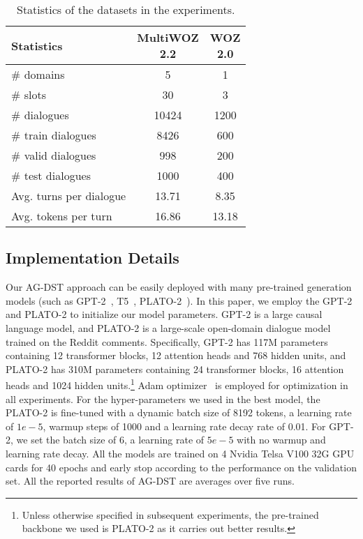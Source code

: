 \documentclass[11pt]{article}
\begin{document}
\begin{table}
\centering
\begin{tabular}{lcc}
\hline
\textbf{Statistics} & \makecell[c]{\textbf{MultiWOZ} \\ \textbf{2.2}} & \makecell[c]{\textbf{WOZ} \\ \textbf{2.0}} \\
\hline
\hline
\# domains & 5 & 1 \\
\# slots & 30 & 3 \\
\# dialogues & 10424 & 1200 \\
\# train dialogues & 8426 & 600 \\
\# valid dialogues & 998 & 200 \\
\# test dialogues & 1000 & 400 \\
Avg. turns per dialogue & 13.71 & 8.35 \\
Avg. tokens per turn & 16.86 & 13.18 \\
\hline
\end{tabular}
\caption{Statistics of the datasets in the experiments.}\label{tab:datasets}
\end{table}

\subsection{Implementation Details}\label{sec:implementation_details}

Our AG-DST approach can be easily deployed with many pre-trained generation models (such as GPT-2~\citep{radford2019language}, T5~\citep{JMLR:v21:20-074}, PLATO-2~\citep{bao-etal-2021-plato}). In this paper, we employ the GPT-2 and PLATO-2 to initialize our model parameters. GPT-2 is a large causal language model, and PLATO-2 is a large-scale open-domain dialogue model trained on the Reddit comments. Specifically, GPT-2 has 117M parameters containing 12 transformer blocks, 12 attention heads and 768 hidden units, and PLATO-2 has 310M parameters containing 24 transformer blocks, 16 attention heads and 1024 hidden units.\footnote{Unless otherwise specified in subsequent experiments, the pre-trained backbone we used is PLATO-2 as it carries out better results.} Adam optimizer~\citep{yoshua2015adam} is employed for optimization in all experiments. For the hyper-parameters we used in the best model, the PLATO-2 is fine-tuned with a dynamic batch size of 8192 tokens, a learning rate of $1e-5$, warmup steps of 1000 and a  learning rate decay rate of 0.01. For GPT-2, we set the batch size of 6, a learning rate of $5e-5$ with no warmup and learning rate decay. All the models are trained on 4 Nvidia Telsa V100 32G GPU cards for 40 epochs and early stop according to the performance on the validation set. All the reported results of AG-DST are averages over five runs.
\end{document}
